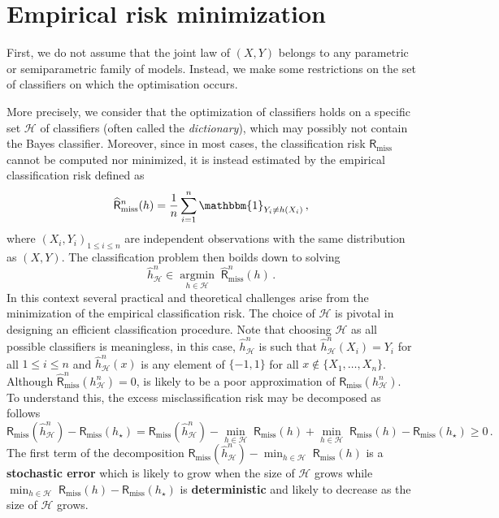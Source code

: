 \documentclass[a4paper,10pt,fleqn]{article}
\newcommand{\eqsp}{\,}
\newcommand{\calH}{\ensuremath{\mathcal{H}}}
\newcommand{\1}{\ensuremath{\mathbbm{1}}}
\newcommand{\argmin}{\mathop{\textrm{argmin}}}
\begin{document}
\section{Empirical risk minimization}
First, we do not assume that the joint law of $(X,Y)$ belongs to any parametric or semiparametric family of models. Instead, we  make some restrictions on the set of classifiers on which the optimisation occurs.

More precisely, we consider that the optimization of classifiers holds on a specific set $\calH$ of classifiers (often called the {\em dictionary}), which may possibly not contain the Bayes classifier. Moreover, since in most cases, the classification risk $\mathsf{R}_{\mathrm{miss}}$ cannot be computed nor  minimized, it is instead estimated by the empirical classification risk  defined as
$$
\widehat {\mathsf{R}}^n_{\mathrm{miss}}(h) = \frac{1}{n}\sum_{i=1}^n \1_{Y_i \neq h(X_i)}\eqsp,
$$
where  $(X_i,Y_i)_{1\leqslant i\leqslant n}$ are independent observations with the same distribution as $(X,Y)$. The classification problem then boilds down to solving
$$
\widehat h^n_{\calH} \in \underset{h\in\calH}{\argmin}\;\widehat {\mathsf{R}}^n_{\mathrm{miss}}(h)\eqsp.
$$
In this context several practical and theoretical challenges arise from the minimization of the empirical classification risk. The choice of $\calH$ is pivotal in designing an efficient classification procedure. Note that choosing $\calH$ as all possible classifiers is meaningless, in this case, $\widehat h^n_{\calH}$ is such that $\widehat h^n_{\calH}(X_i) = Y_i$ for all $1 \leqslant i\leqslant n$ and $\widehat h^n_{\calH}(x)$ is any element of $\{-1,1\}$ for all $x\notin\{X_1,\ldots,X_n\}$. Although $\widehat{\mathsf{R}}^n_{\mathrm{miss}}(h^n_{\calH}) = 0$,  is likely to be  a poor approximation of $\mathsf{R}_{\mathrm{miss}}(h^n_{\calH})$. To understand this, the excess misclassification risk may be decomposed as follows
$$
\mathsf{R}_{\mathrm{miss}}\left(\widehat h^n_{\calH}\right) - \mathsf{R}_{\mathrm{miss}}\left(h_{\star}\right) = \mathsf{R}_{\mathrm{miss}}\left(\widehat h^n_{\calH}\right) - \underset{h\in\calH}{\min}\; \mathsf{R}_{\mathrm{miss}}\left(h\right)  + \underset{h\in\calH}{\min}\; \mathsf{R}_{\mathrm{miss}}\left(h\right)  -  \mathsf{R}_{\mathrm{miss}}\left(h_{\star}\right) \geqslant 0\eqsp.
$$
The first term of the decomposition $\mathsf{R}_{\mathrm{miss}}(\widehat h^n_{\calH}) - \min_{h\in\calH}\; \mathsf{R}_{\mathrm{miss}}\left(h\right)$ is a \textbf{stochastic error} which is likely to grow when the size of $\calH$ grows while $\min_{h\in\calH}\; \mathsf{R}_{\mathrm{miss}}\left(h\right)  -  \mathsf{R}_{\mathrm{miss}}\left(h_{\star}\right)$ is \textbf{deterministic} and likely to decrease as the size of $\calH$ grows.
\end{document}

